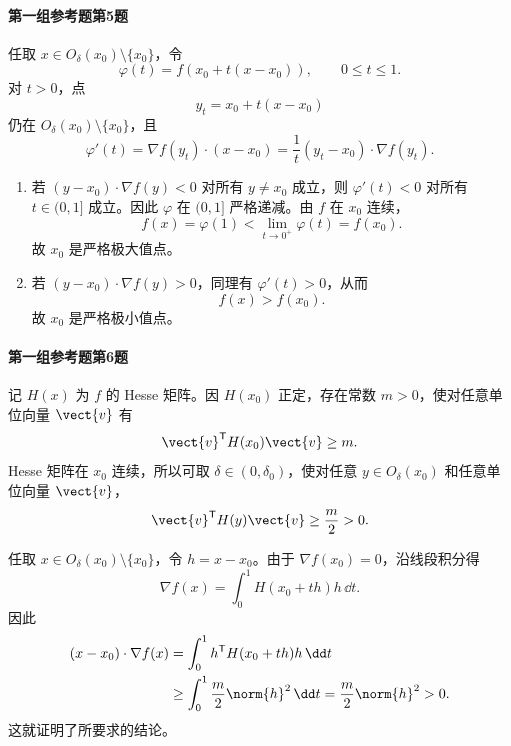 \paragraph{第一组参考题第5题}
\begin{xsolution}
任取 $x\in O_\delta(x_0)\setminus\{x_0\}$，令
\[
  \varphi(t)=f(x_0+t(x-x_0)),
  \qquad0\le t\le1.
\]
对 $t>0$，点
\[
  y_t=x_0+t(x-x_0)
\]
仍在 $O_\delta(x_0)\setminus\{x_0\}$，且
\[
  \varphi'(t)=\nabla f(y_t)\cdot(x-x_0)
  =\frac1t(y_t-x_0)\cdot\nabla f(y_t).
\]

\begin{enumerate}[label=(\arabic*)]
  \item 若 $(y-x_0)\cdot\nabla f(y)<0$ 对所有 $y\ne x_0$ 成立，则 $\varphi'(t)<0$ 对所有 $t\in(0,1]$ 成立。因此 $\varphi$ 在 $(0,1]$ 严格递减。由 $f$ 在 $x_0$ 连续，
  \[
    f(x)=\varphi(1)<\lim_{t\to0^+}\varphi(t)=f(x_0).
  \]
  故 $x_0$ 是严格极大值点。

  \item 若 $(y-x_0)\cdot\nabla f(y)>0$，同理有 $\varphi'(t)>0$，从而
  \[
    f(x)>f(x_0).
  \]
  故 $x_0$ 是严格极小值点。
\end{enumerate}
\end{xsolution}

\paragraph{第一组参考题第6题}
\begin{xsolution}
记 $H(x)$ 为 $f$ 的 Hesse 矩阵。因 $H(x_0)$ 正定，存在常数 $m>0$，使对任意单位向量 $\vect{v}$ 有
\[
  \vect{v}^{\mathsf T}H(x_0)\vect{v}\ge m.
\]
Hesse 矩阵在 $x_0$ 连续，所以可取 $\delta\in(0,\delta_0)$，使对任意 $y\in O_\delta(x_0)$ 和任意单位向量 $\vect{v}$，
\[
  \vect{v}^{\mathsf T}H(y)\vect{v}\ge\frac m2>0.
\]

任取 $x\in O_\delta(x_0)\setminus\{x_0\}$，令 $h=x-x_0$。由于 $\nabla f(x_0)=0$，沿线段积分得
\[
  \nabla f(x)
  =\int_0^1 H(x_0+th)h\,\dd t.
\]
因此
\[
\begin{aligned}
  (x-x_0)\cdot\nabla f(x)
  &=\int_0^1 h^{\mathsf T}H(x_0+th)h\,\dd t\\
  &\ge\int_0^1\frac m2\norm{h}^2\,\dd t
  =\frac m2\norm{h}^2>0.
\end{aligned}
\]
这就证明了所要求的结论。
\end{xsolution}
